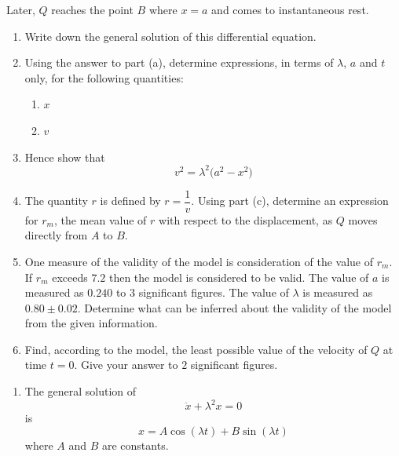 \documentclass[leqno]{article}
\begin{document}
\begin{enumerate}[
  label=\textbf{\arabic*.},
  leftmargin=*,
  topsep=0pt,
  partopsep=0pt,
  parsep=0pt
]
Later, $Q$ reaches the point $B$ where $x=a$ and comes to instantaneous rest. \\
\begin{enumerate}[label=\textbf{(\alph*)}]
  \item Write down the general solution of this differential equation.  \\
  \item Using the answer to part (a), determine expressions, in terms of $\lambda$, $a$ and $t$ only, for the following quantities: 
  \begin{enumerate}[label=(\roman*)]
    \item $x$
    \item $v$
  \end{enumerate}
  \item Hence show that
  \[ v^2=\lambda^2\bigl(a^2-x^2\bigr) \]
  \item The quantity $r$ is defined by $r=\dfrac{1}{v}$. Using part (c), determine an expression for $r_m$, the mean value of $r$ with respect to the displacement, as $Q$ moves directly from $A$ to $B$.  \\
  \item One measure of the validity of the model is consideration of the value of $r_m$. If $r_m$ exceeds $7.2$ then the model is considered to be valid. The value of $a$ is measured as $0.240$ to $3$ significant figures. The value of $\lambda$ is measured as $0.80\pm 0.02$. Determine what can be inferred about the validity of the model from the given information.  \\
  \item Find, according to the model, the least possible value of the velocity of $Q$ at time $t=0$. Give your answer to $2$ significant figures.  \\
\end{enumerate}

\vspace*{30pt}

\begin{tcolorbox}[colback=white, colframe=scarlet, title={\textbf{Solution}}, breakable, grow to left by=6mm, grow to right by=10mm]
\begin{enumerate}[label=\textbf{(\alph*)}]
  \item The general solution of
  \[
  \ddot{x}+\lambda^2x=0
  \]
  is
  \[
  x=A\cos(\lambda t)+B\sin(\lambda t)
  \]
  where $A$ and $B$ are constants.


\end{enumerate}
\end{tcolorbox}
\end{enumerate}
\end{document}
